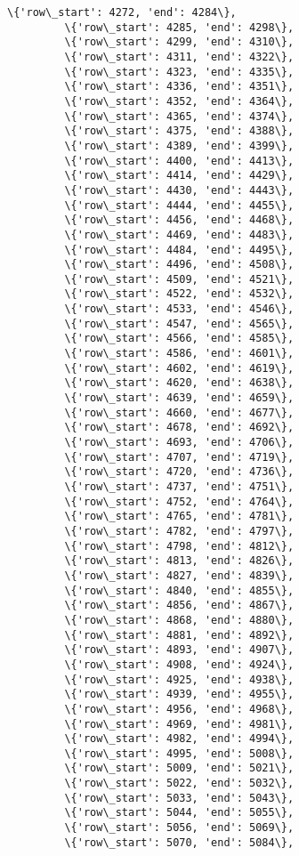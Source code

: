 \documentclass[11pt]{article}
\begin{document}
\begin{Verbatim}[commandchars=\\\{\}]
         \{'row\_start': 4272, 'end': 4284\},
         \{'row\_start': 4285, 'end': 4298\},
         \{'row\_start': 4299, 'end': 4310\},
         \{'row\_start': 4311, 'end': 4322\},
         \{'row\_start': 4323, 'end': 4335\},
         \{'row\_start': 4336, 'end': 4351\},
         \{'row\_start': 4352, 'end': 4364\},
         \{'row\_start': 4365, 'end': 4374\},
         \{'row\_start': 4375, 'end': 4388\},
         \{'row\_start': 4389, 'end': 4399\},
         \{'row\_start': 4400, 'end': 4413\},
         \{'row\_start': 4414, 'end': 4429\},
         \{'row\_start': 4430, 'end': 4443\},
         \{'row\_start': 4444, 'end': 4455\},
         \{'row\_start': 4456, 'end': 4468\},
         \{'row\_start': 4469, 'end': 4483\},
         \{'row\_start': 4484, 'end': 4495\},
         \{'row\_start': 4496, 'end': 4508\},
         \{'row\_start': 4509, 'end': 4521\},
         \{'row\_start': 4522, 'end': 4532\},
         \{'row\_start': 4533, 'end': 4546\},
         \{'row\_start': 4547, 'end': 4565\},
         \{'row\_start': 4566, 'end': 4585\},
         \{'row\_start': 4586, 'end': 4601\},
         \{'row\_start': 4602, 'end': 4619\},
         \{'row\_start': 4620, 'end': 4638\},
         \{'row\_start': 4639, 'end': 4659\},
         \{'row\_start': 4660, 'end': 4677\},
         \{'row\_start': 4678, 'end': 4692\},
         \{'row\_start': 4693, 'end': 4706\},
         \{'row\_start': 4707, 'end': 4719\},
         \{'row\_start': 4720, 'end': 4736\},
         \{'row\_start': 4737, 'end': 4751\},
         \{'row\_start': 4752, 'end': 4764\},
         \{'row\_start': 4765, 'end': 4781\},
         \{'row\_start': 4782, 'end': 4797\},
         \{'row\_start': 4798, 'end': 4812\},
         \{'row\_start': 4813, 'end': 4826\},
         \{'row\_start': 4827, 'end': 4839\},
         \{'row\_start': 4840, 'end': 4855\},
         \{'row\_start': 4856, 'end': 4867\},
         \{'row\_start': 4868, 'end': 4880\},
         \{'row\_start': 4881, 'end': 4892\},
         \{'row\_start': 4893, 'end': 4907\},
         \{'row\_start': 4908, 'end': 4924\},
         \{'row\_start': 4925, 'end': 4938\},
         \{'row\_start': 4939, 'end': 4955\},
         \{'row\_start': 4956, 'end': 4968\},
         \{'row\_start': 4969, 'end': 4981\},
         \{'row\_start': 4982, 'end': 4994\},
         \{'row\_start': 4995, 'end': 5008\},
         \{'row\_start': 5009, 'end': 5021\},
         \{'row\_start': 5022, 'end': 5032\},
         \{'row\_start': 5033, 'end': 5043\},
         \{'row\_start': 5044, 'end': 5055\},
         \{'row\_start': 5056, 'end': 5069\},
         \{'row\_start': 5070, 'end': 5084\},

\end{Verbatim}
\end{document}
